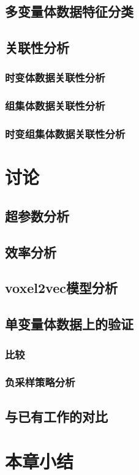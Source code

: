 \subsection{多变量体数据特征分类}
\subsection{关联性分析}
\subsubsection{时变体数据关联性分析}
\subsubsection{组集体数据关联性分析}
\subsubsection{时变组集体数据关联性分析}

\section{讨论}
\subsection{超参数分析}
\subsection{效率分析}
\subsection{voxel2vec模型分析}
\subsection{单变量体数据上的验证}
\subsubsection{比较}
\subsubsection{负采样策略分析}
\subsection{与已有工作的对比}
\section{本章小结}

